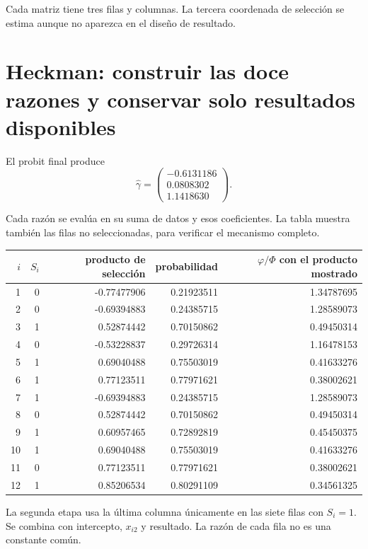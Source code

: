 \documentclass[11pt,a4paper]{article}
\begin{document}
Cada matriz tiene tres
filas y columnas.
La tercera coordenada
de selección se estima
aunque no aparezca
en el diseño de resultado.

\clearpage
\section{Heckman: construir las doce razones y conservar solo resultados disponibles}\label{unidad160}
El probit final produce
\[
\widehat\gamma=\begin{pmatrix}-0.6131186\\0.0808302\\1.1418630\end{pmatrix}.
\]

Cada razón se evalúa
en su suma de datos
y esos coeficientes.
La tabla muestra también
las filas no seleccionadas,
para verificar el mecanismo completo.
\begin{center}\small\begin{tabular}{rrrrr}\toprule
\(i\)&\(S_i\)&producto de selección&probabilidad&\(\varphi/\Phi\) con el producto mostrado\\\midrule
1&0&-0.77477906&0.21923511&1.34787695\\
2&0&-0.69394883&0.24385715&1.28589073\\
3&1&0.52874442&0.70150862&0.49450314\\
4&0&-0.53228837&0.29726314&1.16478153\\
5&1&0.69040488&0.75503019&0.41633276\\
6&1&0.77123511&0.77971621&0.38002621\\
7&1&-0.69394883&0.24385715&1.28589073\\
8&0&0.52874442&0.70150862&0.49450314\\
9&1&0.60957465&0.72892819&0.45450375\\
10&1&0.69040488&0.75503019&0.41633276\\
11&0&0.77123511&0.77971621&0.38002621\\
12&1&0.85206534&0.80291109&0.34561325\\\bottomrule\end{tabular}\end{center}
La segunda etapa usa
la última columna únicamente
en las siete filas
con \(S_i=1\).
Se combina con intercepto,
\(x_{i2}\) y resultado.
La razón de cada fila
no es una constante común.
\end{document}
